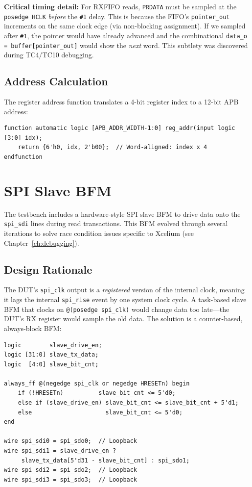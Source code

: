 \textbf{Critical timing detail:} For RXFIFO reads, \texttt{PRDATA} must be sampled at the
\texttt{posedge HCLK} \emph{before} the \texttt{\#1} delay. This is because the FIFO's
\texttt{pointer\_out} increments on the same clock edge (via non-blocking assignment). If we
sampled after \texttt{\#1}, the pointer would have already advanced and the combinational
\texttt{data\_o = buffer[pointer\_out]} would show the \emph{next} word. This subtlety was
discovered during TC4/TC10 debugging.

\subsection{Address Calculation}

The register address function translates a 4-bit register index to a 12-bit APB address:
\begin{lstlisting}
function automatic logic [APB_ADDR_WIDTH-1:0] reg_addr(input logic [3:0] idx);
    return {6'h0, idx, 2'b00};  // Word-aligned: index x 4
endfunction
\end{lstlisting}

\section{SPI Slave BFM}
\label{sec:slave_bfm}

The testbench includes a hardware-style SPI slave BFM to drive data onto the \texttt{spi\_sdi}
lines during read transactions. This BFM evolved through several iterations to solve race
condition issues specific to Xcelium (see Chapter~\ref{ch:debugging}).

\subsection{Design Rationale}

The DUT's \texttt{spi\_clk} output is a \emph{registered} version of the internal clock, meaning
it lags the internal \texttt{spi\_rise} event by one system clock cycle. A task-based slave BFM
that clocks on \texttt{@(posedge spi\_clk)} would change data too late---the DUT's RX register
would sample the old data. The solution is a counter-based, always-block BFM:

\begin{lstlisting}
logic        slave_drive_en;
logic [31:0] slave_tx_data;
logic  [4:0] slave_bit_cnt;

always_ff @(negedge spi_clk or negedge HRESETn) begin
    if (!HRESETn)          slave_bit_cnt <= 5'd0;
    else if (slave_drive_en) slave_bit_cnt <= slave_bit_cnt + 5'd1;
    else                     slave_bit_cnt <= 5'd0;
end

wire spi_sdi0 = spi_sdo0;  // Loopback
wire spi_sdi1 = slave_drive_en ?
     slave_tx_data[5'd31 - slave_bit_cnt] : spi_sdo1;
wire spi_sdi2 = spi_sdo2;  // Loopback
wire spi_sdi3 = spi_sdo3;  // Loopback
\end{lstlisting}

